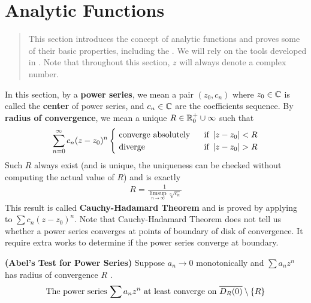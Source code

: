 \documentclass{report}
\begin{document}
\section{Analytic Functions}
\label{Analytic Functions}
\begin{abstract}
This section introduces the concept of analytic functions and proves some of their basic properties, including the . We will rely on the tools developed in . Note that throughout this section,  
$z$ will always denote a complex number.
\end{abstract}
\begin{mdframed}
In this section, by a  \textbf{power series}, we mean a pair $(z_0,c_n)$ where $z_0 \in\mathbb{C}$ is called the \textbf{center} of power series, and $c_n\in\mathbb{C}$ are the coefficients sequence. By \textbf{radius of convergence}, we mean a unique  $R \in \mathbb{R}^+_0 \cup  \infty$ such that 
 \begin{align*}
\sum_{n=0}^\infty c_n(z-z_0)^n
\begin{cases}
  \text{ converge absolutely }& \text{ if  }\abso{z-z_0}<R\\
  \text{ diverge }& \text{ if  }\abso{z-z_0}>R\\
\end{cases}
\end{align*}
Such $R$ always exist (and is unique, the uniqueness can be checked without computing the actual value of $R$) and is exactly 
\begin{align}
\label{Cauchy-Hadamard}
R=\frac{1}{\limsup_{n\to\infty} \sqrt[n]{c_n} }
\end{align}
This result is called \textbf{Cauchy-Hadamard Theorem} and is proved by applying  to $\sum c_n(z-z_0)^n$. Note that Cauchy-Hadamard Theorem does not tell us whether a power series converges at points of boundary of disk of convergence. It require extra works to determine if the power series converge at boundary. 
\end{mdframed}
\begin{theorem}
\label{Abel's Test for Power Series}
\textbf{(Abel's Test for Power Series)} Suppose $a_n\to0$ monotonically and $\sum a_nz^n$ has radius of convergence $R$ . 
\begin{align*}
  \text{ The power series $\sum a_nz^n$ at least converge on $\overline{D_R(0)}\setminus \left\{ R \right\}$ }
\end{align*}
\end{theorem}
\end{document}
